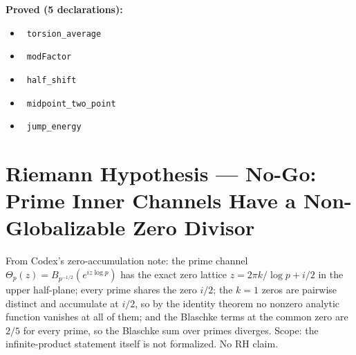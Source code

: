 \documentclass{report}
\theoremstyle{definition}
\begin{document}
\noindent\textbf{Proved (5 declarations):}
\begin{itemize}
  \item {}\leanok\ \texttt{torsion\_average}
  \item {}\leanok\ \texttt{modFactor}
  \item {}\leanok\ \texttt{half\_shift}
  \item {}\leanok\ \texttt{midpoint\_two\_point}
  \item {}\leanok\ \texttt{jump\_energy}
\end{itemize}

\section{Riemann Hypothesis --- No-Go: Prime Inner Channels Have a Non-Globalizable Zero Divisor}
From Codex's zero-accumulation note: the prime channel $\Theta_p(z)=B_{p^{-1/2}}(e^{iz\log p})$ has the exact zero lattice $z=2\pi k/\log p+i/2$ in the upper half-plane; every prime shares the zero $i/2$; the $k=1$ zeros are pairwise distinct and accumulate at $i/2$, so by the identity theorem no nonzero analytic function vanishes at all of them; and the Blaschke terms at the common zero are $2/5$ for every prime, so the Blaschke sum over primes diverges. Scope: the infinite-product statement itself is not formalized. No RH claim.
\end{document}
